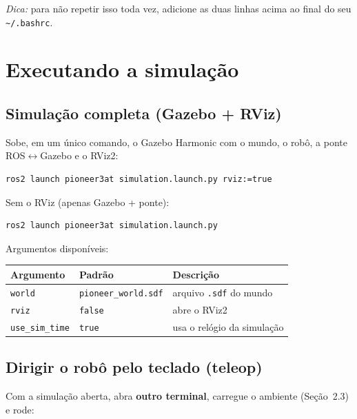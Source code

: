 \documentclass[11pt,a4paper]{article}
\begin{document}
\noindent
\textit{Dica:} para não repetir isso toda vez, adicione as duas linhas acima ao
final do seu \texttt{\textasciitilde/.bashrc}.

\section{Executando a simulação}

\subsection{Simulação completa (Gazebo + RViz)}

Sobe, em um único comando, o Gazebo Harmonic com o mundo, o robô, a ponte
ROS$\leftrightarrow$Gazebo e o RViz2:

\begin{lstlisting}
ros2 launch pioneer3at simulation.launch.py rviz:=true
\end{lstlisting}

\noindent
Sem o RViz (apenas Gazebo + ponte):

\begin{lstlisting}
ros2 launch pioneer3at simulation.launch.py
\end{lstlisting}

\noindent
Argumentos disponíveis:

\begin{center}
\begin{tabular}{lll}
\toprule
\textbf{Argumento} & \textbf{Padrão} & \textbf{Descrição} \\
\midrule
\texttt{world}        & \texttt{pioneer\_world.sdf} & arquivo \texttt{.sdf} do mundo \\
\texttt{rviz}         & \texttt{false}              & abre o RViz2 \\
\texttt{use\_sim\_time} & \texttt{true}             & usa o relógio da simulação \\
\bottomrule
\end{tabular}
\end{center}

\subsection{Dirigir o robô pelo teclado (teleop)}

Com a simulação aberta, abra \textbf{outro terminal}, carregue o ambiente
(Seção~2.3) e rode:
\end{document}
